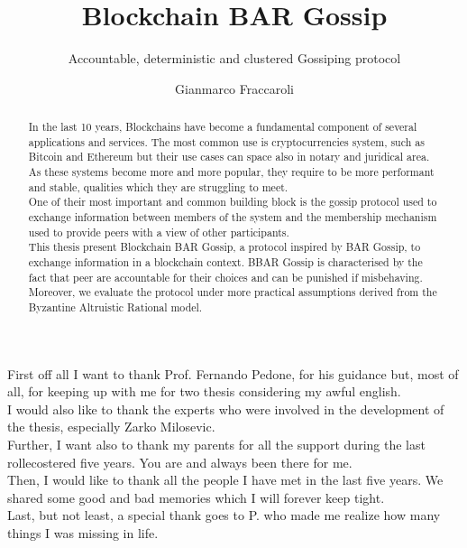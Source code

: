 \documentclass[mscthesis]{usiinfthesis}
\title{Blockchain BAR Gossip} %
\subtitle{Accountable, deterministic and clustered Gossiping protocol} %
\author{Gianmarco Fraccaroli} %
\begin{document}
\maketitle %

\frontmatter %

\begin{abstract}
In the last 10 years, Blockchains have become a fundamental component of several applications and services. The most common use is cryptocurrencies system, such as Bitcoin and Ethereum but their use cases can space also in notary and juridical area. As these systems become more and more popular, they require to be more performant and stable, qualities which they are struggling to meet. \\
One of their most important and common building block is the gossip protocol used to exchange information between members of the system and the membership mechanism used to provide peers with a view of other participants. \\
This thesis present Blockchain BAR Gossip, a protocol inspired by BAR Gossip, to exchange information in a blockchain context. BBAR Gossip is characterised by the fact that peer are accountable for their choices and can be punished if misbehaving. Moreover, we evaluate the protocol under more practical assumptions derived from the Byzantine Altruistic Rational model.
\end{abstract}



\begin{acknowledgements}
First off all I want to thank Prof. Fernando Pedone, for his guidance but, most of all, for keeping up with me for two thesis considering my awful english. \\
I would also like to thank the experts who were involved in the development of the thesis, especially Zarko Milosevic. \\
Further, I want also to thank  my parents for all the support during the last rollecostered five years. You are and always been there for me. \\
Then, I would like to thank all the people I have met in the last five years. We shared some good and bad memories which I will forever keep tight. \\
Last, but not least, a special thank goes to P. who made me realize how many things I was missing in life. 

\end{acknowledgements}
\end{document}
